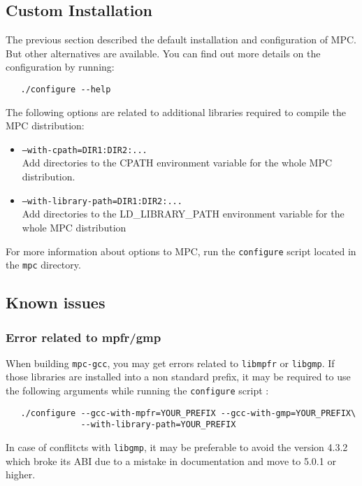 \documentclass[a4paper,11pt]{article}
\begin{document}
\subsection{Custom Installation}
The previous section described the default installation and configuration of MPC.
But other alternatives are available. You can find out more details on the
configuration by running:

\begin{verbatim}
   ./configure --help
\end{verbatim}

The following options are related to additional libraries required to compile the MPC distribution:
\begin{itemize}
\item \texttt{--with-cpath=DIR1:DIR2:...}   \\
    Add directories to the CPATH environment variable for the whole MPC distribution.
\item  \texttt{--with-library-path=DIR1:DIR2:...}\\
    Add directories to the LD\_LIBRARY\_PATH environment variable for the whole MPC distribution
\end{itemize}

For more information about options to MPC, run the \texttt{configure} script located in the \texttt{mpc} directory.

\subsection{Known issues}
\label{sec:installationKnownBugs}

\subsubsection{Error related to mpfr/gmp}

When building \texttt{mpc-gcc}, you may get errors related to  \texttt{libmpfr} or \texttt{libgmp}.
If those libraries are installed into a non standard prefix, it may be required to use the following
arguments while running the \texttt{configure} script :

\begin{verbatim}
   ./configure --gcc-with-mpfr=YOUR_PREFIX --gcc-with-gmp=YOUR_PREFIX\
               --with-library-path=YOUR_PREFIX
\end{verbatim}

In case of conflitcts with \texttt{libgmp}, it may be preferable to avoid the version 4.3.2 which
broke its ABI due to a mistake in documentation and move to 5.0.1 or higher.
\end{document}
